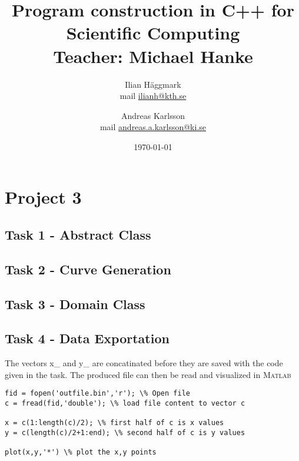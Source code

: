 \documentclass[paper=a4, fontsize=12pt]{article} %
\title{Program construction in C++ for Scientific Computing \\ Teacher: Michael Hanke}
\author{Ilian H{\"a}ggmark \\ mail \href{mailto:ilianh@kth.se}{ilianh@kth.se}
  \and Andreas Karlsson \\ mail \href{mailto:andreas.a.karlsson@ki.se}{andreas.a.karlsson@ki.se} }
\date{\normalsize\today} %
\begin{document}
\maketitle %

\section*{Project 3}
\subsection*{Task 1 - Abstract Class}





\subsection*{Task 2 - Curve Generation}

\subsection*{Task 3 - Domain Class}


\subsection*{Task 4 - Data Exportation}

The vectors x\_ and y\_ are concatinated before they are saved with the code given in the task. The produced file can then be read and visualized in \textsc{Matlab} 

\begin{lstlisting}
fid = fopen('outfile.bin','r'); \% Open file
c = fread(fid,'double'); \% load file content to vector c

x = c(1:length(c)/2); \% first half of c is x values
y = c(length(c)/2+1:end); \% second half of c is y values

plot(x,y,'*') \% plot the x,y points 
 \end{lstlisting}  
\end{document}
